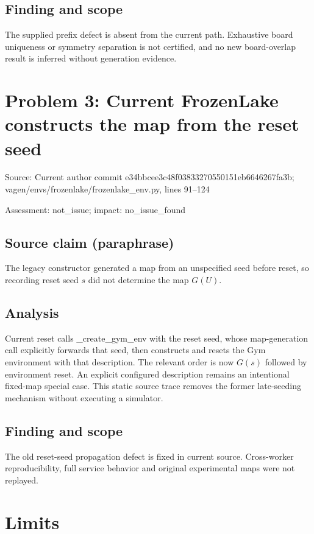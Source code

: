 \documentclass[11pt]{article}
\begin{document}
\subsection*{Finding and scope}

The supplied prefix defect is absent from the current path. Exhaustive board uniqueness or symmetry separation is not certified, and no new board-overlap result is inferred without generation evidence.

\section*{Problem 3: Current FrozenLake constructs the map from the reset seed}

Source: Current author commit e34bbcee3c48f03833270550151eb6646267fa3b; vagen/envs/frozenlake/frozenlake\_env.py, lines 91–124

Assessment: not\_issue; impact: no\_issue\_found

\subsection*{Source claim (paraphrase)}

The legacy constructor generated a map from an unspecified seed before reset, so recording reset seed \(s\) did not determine the map \(G(U)\).

\subsection*{Analysis}

Current reset calls \_create\_gym\_env with the reset seed, whose map-generation call explicitly forwards that seed, then constructs and resets the Gym environment with that description. The relevant order is now \(G(s)\) followed by environment reset. An explicit configured description remains an intentional fixed-map special case. This static source trace removes the former late-seeding mechanism without executing a simulator.

\subsection*{Finding and scope}

The old reset-seed propagation defect is fixed in current source. Cross-worker reproducibility, full service behavior and original experimental maps were not replayed.

\section*{Limits}
\end{document}
